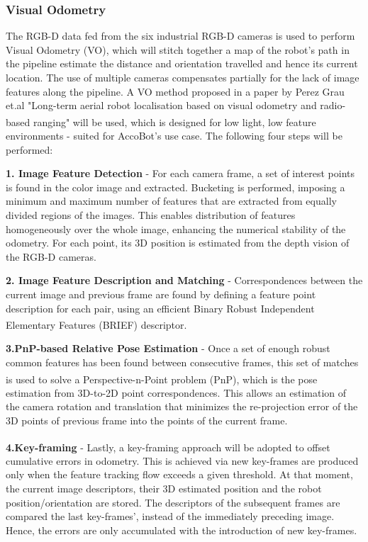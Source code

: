 \documentclass[11pt]{article}		%
\newcommand{\supercite}[1]{\textsuperscript{\cite{#1}}}		%
\begin{document}
	\subsubsection{Visual Odometry}
	The RGB-D data fed from the six industrial RGB-D cameras is used to perform Visual Odometry (VO), which will stitch together a map of the robot's path in the pipeline estimate the distance and orientation travelled and hence its current location. The use of multiple cameras compensates partially for the lack of image features along the pipeline. A VO method proposed in a paper by Perez Grau et.al "Long-term aerial robot localisation based on visual odometry and radio-based ranging"\supercite{VO} will be used, which is designed for low light, low feature environments - suited for AccoBot's use case. The following four steps will be performed:

	\textbf{1. Image Feature Detection} - For each camera frame, a set of interest points is found in the color image and extracted. Bucketing is performed, imposing a minimum and maximum number of features that are extracted from equally divided regions of the images. This enables distribution of features homogeneously over the whole image, enhancing the numerical stability of the odometry. For each point, its 3D position is estimated from the depth vision of the RGB-D cameras.
	
	\textbf{2. Image Feature Description and Matching} - Correspondences between the current image and previous frame are found by defining a feature point description for each pair, using an efficient Binary Robust Independent Elementary Features (BRIEF)\supercite{BRIEF} descriptor. 
    
    \textbf{3.PnP-based Relative Pose Estimation} - Once a set of enough robust common features has been found between consecutive frames, this set of matches is used to solve a Perspective-n-Point problem (PnP)\supercite{PnP}, which is the pose estimation from 3D-to-2D point correspondences. This allows an estimation of the camera rotation and translation that minimizes the re-projection error of the 3D points of previous frame into the points of the current frame. 

    \textbf{4.Key-framing} - Lastly, a key-framing approach\supercite{keyframing} will be adopted to offset cumulative errors in odometry. This is achieved via new key-frames are produced only when the feature tracking flow exceeds a given threshold. At that moment, the current image descriptors, their 3D estimated position and the robot position/orientation are stored. The descriptors of the subsequent frames are compared the last key-frames', instead of the immediately preceding image. Hence, the errors are only accumulated with the introduction of new key-frames.
\end{document}

